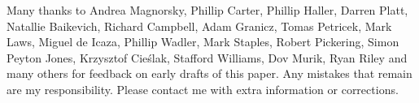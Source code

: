 \documentclass[acmsmall]{acmart}\settopmatter{}
\begin{document}
\begin{acks}                            %

Many thanks to Andrea Magnorsky, Phillip Carter, Phillip Haller, Darren Platt, Natallie Baikevich, Richard Campbell, Adam Granicz, Tomas Petricek, Mark Laws, Miguel de Icaza, Phillip Wadler, Mark Staples, Robert Pickering, Simon Peyton Jones, Krzysztof Cieślak, Stafford Williams, Dov Murik, Ryan Riley   and many others for feedback on early drafts of this paper.  Any mistakes that remain are my responsibility. Please contact me with extra information or corrections.

\end{acks}





%
\end{document}
